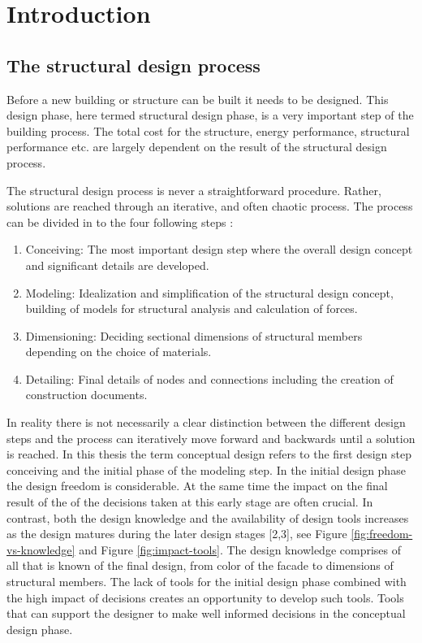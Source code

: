 \chapter{Introduction}
\section{The structural design process}
Before a new building or structure can be built it needs to be designed. This design phase, here termed structural design phase, is a very important step of the building process. The total cost for the structure, energy performance, structural performance etc. are largely dependent on the result of the structural design process. 

The structural design process is never a straightforward procedure. Rather, solutions are reached through an iterative, and often chaotic process. The process can be divided in to the four following steps \cite{schlaich2006challenges}:

\begin{enumerate}  
\item Conceiving: The most important design step where the overall design concept and significant details are developed.
\item Modeling: Idealization and simplification of the structural design concept, building of models for structural analysis and calculation of forces.
\item Dimensioning: Deciding sectional dimensions of structural members depending on the choice of materials.
\item Detailing: Final details of nodes and connections including the creation of construction documents.
\end{enumerate}

In reality there is not necessarily a clear distinction between the different design steps and the process can iteratively move forward and backwards until a solution is reached. In this thesis the term conceptual design refers to the first design step conceiving and the initial phase of the modeling step. In the initial design phase the design freedom is considerable. At the same time the impact on the final result of the of the decisions taken at this early stage are often crucial. In contrast, both the design knowledge and the availability of design tools increases as the design matures during the later design stages [2,3], see Figure \ref{fig:freedom-vs-knowledge} and Figure \ref{fig:impact-tools}. The design knowledge comprises of all that is known of the final design, from color of the facade to dimensions of structural members. The lack of tools for the initial design phase combined with the high impact of decisions creates an opportunity to develop such tools. Tools that can support the designer to make well informed decisions in the conceptual design phase.

